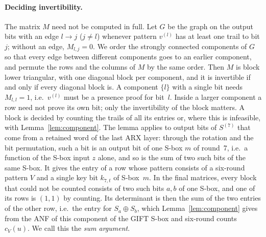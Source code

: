 \documentclass[11pt,a4paper]{article}
\theoremstyle{definition}
\theoremstyle{remark}
\begin{document}
\paragraph{Deciding invertibility.} The matrix $M$ need not be computed in full. Let $G$ be the graph on the output bits with an edge $l\to j$ ($j\neq l$) whenever pattern $v^{(l)}$ has at least one trail to bit $j$; without an edge, $M_{l,j}=0$. We order the strongly connected components of $G$ so that every edge between different components goes to an earlier component, and permute the rows and the columns of $M$ by the same order. Then $M$ is block lower triangular, with one diagonal block per component, and it is invertible if and only if every diagonal block is. A component $\{l\}$ with a single bit needs $M_{l,l}=1$, i.e.\ $v^{(l)}$ must be a presence proof for bit~$l$. Inside a larger component a row need not prove its own bit; only the invertibility of the block matters. A block is decided by counting the trails of all its entries or, where this is infeasible, with Lemma~\ref{lem:component}. The lemma applies to output bits of $S^{(7)}$ that come from a retained word of the last ARX layer: through the rotation and the bit permutation, such a bit is an output bit of one S-box $m$ of round~7, i.e.\ a function of the S-box input $z$ alone, and so is the sum of two such bits of the same S-box. It gives the entry of a row whose pattern consists of a six-round pattern $V$ and a single key bit $k_{7,t}$ of S-box~$m$. In the final matrices, every block that could not be counted consists of two such bits $a,b$ of one S-box, and one of its rows is $(1,1)$ by counting. Its determinant is then the sum of the two entries of the other row, i.e.\ the entry for $S_a\oplus S_b$, which Lemma~\ref{lem:component} gives from the ANF of this component of the GIFT S-box and six-round counts $c_V(u)$. We call this the \emph{sum argument}.
\end{document}
